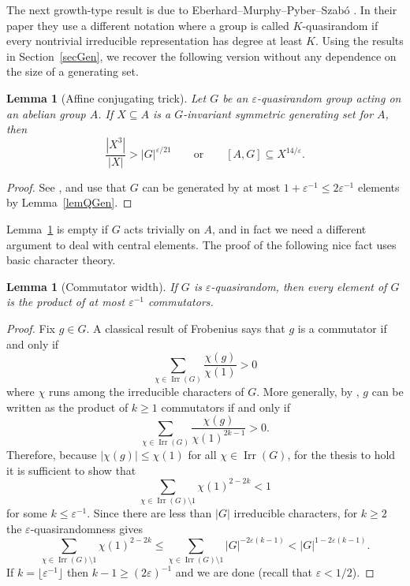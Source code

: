 \documentclass[11pt,reqno]{amsart}
\numberwithin{equation}{section}
\newtheorem{lemma}[theorem]{Lemma}
\theoremstyle{definition}
\theoremstyle{remark}
\newcommand{\Irr}{\mathop{\mathrm{Irr}}}
\begin{document}
The next growth-type result is due to Eberhard--Murphy--Pyber--Szab\'o \cite{EMPS25}.
In their paper they use a different notation where a group is called $K$-quasirandom
if every nontrivial irreducible representation has degree at least $K$.
Using the results in Section~\ref{secGen},
we recover the following version without any dependence on the size of a generating set.

\begin{lemma}[Affine conjugating trick] \label{lemACT}
Let $G$ be an $\varepsilon$-quasirandom group acting on an abelian group $A$.
If $X \subseteq A$ is a $G$-invariant symmetric generating set for $A$,
then
$$ \frac{|X^3|}{|X|} > |G|^{\varepsilon/21} \qquad \text{or} \qquad [A,G] \subseteq X^{14/\varepsilon} . $$
\end{lemma}
\begin{proof}
See \cite[Lemma~1.8]{EMPS25},
and use that $G$ can be generated by at most $1 + \varepsilon^{-1} \leq 2 \varepsilon^{-1}$ elements
by Lemma~\ref{lemQGen}.
\end{proof}

Lemma~\ref{lemACT} is empty if $G$ acts trivially on $A$,
and in fact we need a different argument to deal with central elements.
The proof of the following nice fact uses basic character theory.

\begin{lemma}[Commutator width] \label{lemWid}
If $G$ is $\varepsilon$-quasirandom,
then every element of $G$ is the product of at most $\varepsilon^{-1}$ commutators.
\end{lemma}
\begin{proof}
Fix $g \in G$.
A classical result of Frobenius says that $g$ is a commutator if and only if
$$ \sum_{\chi \in \Irr(G)} \frac{\chi(g)}{\chi(1)} > 0 $$
where $\chi$ runs among the irreducible characters of $G$.
More generally, by \cite[Lemma~9.1]{Sha09},
$g$ can be written as the product of $k \geq 1$ commutators if and only if
$$ \sum_{\chi \in \Irr(G)} \frac{\chi(g)}{\chi(1)^{2k-1}} > 0 . $$
Therefore, because $|\chi(g)| \leq \chi(1)$ for all $\chi \in \Irr(G)$,
for the thesis to hold it is sufficient to show that
$$ \sum_{\chi \in \Irr(G) \setminus 1} \chi(1)^{2-2k} < 1 $$
for some $k \leq \varepsilon^{-1}$.
Since there are less than $|G|$ irreducible characters, for $k \geq 2$ the $\varepsilon$-quasirandomness gives
$$ \sum_{\chi \in \Irr(G) \setminus 1} \chi(1)^{2-2k} \leq 
\sum_{\chi \in \Irr(G) \setminus 1} |G|^{-2\varepsilon (k-1)} < 
|G|^{1 -2\varepsilon (k-1)} . $$
If $k = \lfloor \varepsilon^{-1} \rfloor$ then $k-1 \geq (2 \varepsilon)^{-1}$ and we are done
(recall that $\varepsilon < 1/2$).
\end{proof}
\end{document}
